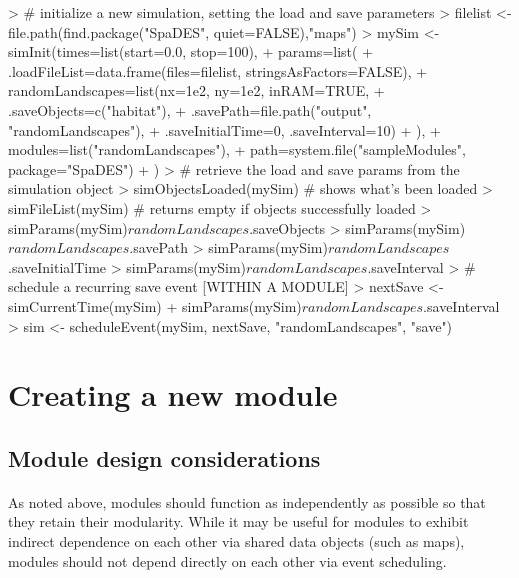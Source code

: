 \documentclass{article}
\begin{document}
\begin{Schunk}
\begin{Sinput}
> # initialize a new simulation, setting the load and save parameters
> filelist <- file.path(find.package("SpaDES", quiet=FALSE),"maps")
> mySim <- simInit(times=list(start=0.0, stop=100),
+                  params=list(
+                    .loadFileList=data.frame(files=filelist, stringsAsFactors=FALSE),
+                    randomLandscapes=list(nx=1e2, ny=1e2, inRAM=TRUE,
+                                 .saveObjects=c("habitat"),
+                                 .savePath=file.path("output", "randomLandscapes"),
+                                 .saveInitialTime=0, .saveInterval=10)
+                    ),
+                  modules=list("randomLandscapes"),
+                  path=system.file("sampleModules", package="SpaDES")
+ )
> # retrieve the load and save params from the simulation object
> simObjectsLoaded(mySim) # shows what's been loaded
> simFileList(mySim) # returns empty if objects successfully loaded
> simParams(mySim)$randomLandscapes$.saveObjects
> simParams(mySim)$randomLandscapes$.savePath
> simParams(mySim)$randomLandscapes$.saveInitialTime
> simParams(mySim)$randomLandscapes$.saveInterval
> # schedule a recurring save event [WITHIN A MODULE]
> nextSave <- simCurrentTime(mySim) + simParams(mySim)$randomLandscapes$.saveInterval
> sim <- scheduleEvent(mySim, nextSave, "randomLandscapes", "save")
\end{Sinput}
\end{Schunk}

\newpage

\section{Creating a new module}

\subsection{Module design considerations}

\paragraph{}
\textit{\color{blue}{perhaps a bit about design phlosophy, relating back to dependencies and how to carefully build modules that actually retain modularity.}}

\paragraph{}
As noted above, modules should function as independently as possible so that they retain their modularity. While it may be useful for modules to exhibit indirect dependence on each other via shared data objects (such as maps), modules should not depend directly on each other via event scheduling.
\end{document}
